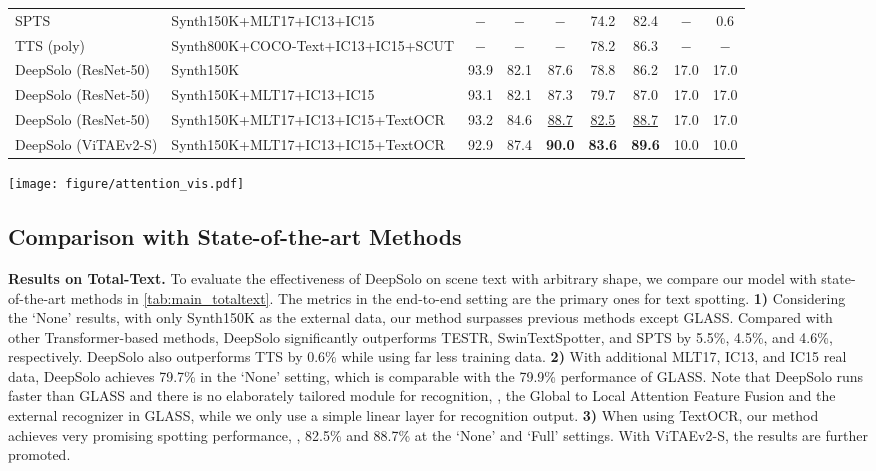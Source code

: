 \documentclass[10pt,twocolumn,letterpaper]{article}
\begin{document}
\begin{table*}[!t]
{\begin{tabular}{l|l|ccc|cc|c|c}
SPTS \cite{peng2022spts} &Synth150K+MLT17+IC13+IC15 &$-$ &$-$ &$-$ &74.2 &82.4 &$-$ &0.6 \\
TTS (poly) \cite{kittenplon2022towards} &Synth800K+COCO-Text+IC13+IC15+SCUT &$-$ &$-$ &$-$ &78.2 &86.3 &$-$ &$-$ \\
\rowcolor{gray!20} DeepSolo (ResNet-50) &Synth150K &93.9 & 82.1 & 87.6 & 78.8 & 86.2 &17.0 &17.0 \\
\rowcolor{gray!20} DeepSolo (ResNet-50) &Synth150K+MLT17+IC13+IC15 &93.1 & 82.1 & 87.3 & 79.7 & 87.0 &17.0 &17.0 \\
\rowcolor{gray!20} DeepSolo (ResNet-50) &Synth150K+MLT17+IC13+IC15+TextOCR &93.2 & 84.6 & \underline{88.7} & \underline{82.5} & \underline{88.7} &17.0 &17.0 \\
\rowcolor{gray!20} DeepSolo (ViTAEv2-S) &Synth150K+MLT17+IC13+IC15+TextOCR &92.9 & 87.4 & \textbf{90.0} & \textbf{83.6} & \textbf{89.6} &10.0 &10.0 \\
\bottomrule[1.5pt]\end{tabular}}
\caption{Performance on Total-Text. ‘*’: character-level annotations are used. ‘*’ has the same meaning for other tables.}
\label{tab:main_totaltext}
\end{table*}


\begin{figure*}[!ht]
    \centering
    \texttt{[image: figure/attention\_vis.pdf]}
    \caption{Visualization of the spotting results, attention on different scale features, and attention of point queries.}
    \label{fig:attn_vis}
\end{figure*}

\subsection{Comparison with State-of-the-art Methods}
\noindent \textbf{Results on Total-Text.} To evaluate the effectiveness of DeepSolo on scene text with arbitrary shape, we compare our model with state-of-the-art methods in \cref{tab:main_totaltext}. The metrics in the end-to-end setting are the primary ones for text spotting. \textbf{1)} Considering the `None' results, with only Synth150K as the external data, our method surpasses previous methods except GLASS. Compared with other Transformer-based methods, DeepSolo significantly outperforms TESTR, SwinTextSpotter, and SPTS by 5.5\%, 4.5\%, and 4.6\%, respectively. DeepSolo also outperforms TTS by 0.6\% while using far less training data. \textbf{2)} With additional MLT17, IC13, and IC15 real data, DeepSolo achieves 79.7\% in the `None' setting, which is comparable with the 79.9\% performance of GLASS. Note that DeepSolo runs faster than GLASS and there is no elaborately tailored module for recognition, \eg, the Global to Local Attention Feature Fusion and the external recognizer in GLASS, while we only use a simple linear layer for recognition output. \textbf{3)} When using TextOCR, our method achieves very promising spotting performance, \ie, 82.5\% and 88.7\% at the `None' and `Full' settings. With ViTAEv2-S, the results are further promoted.
\end{document}
